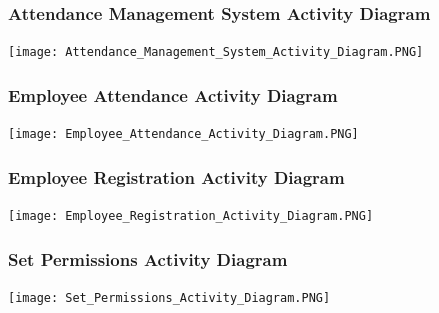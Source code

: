 \documentclass[a4paper, 12pt]{article}
\begin{document}
\subsubsection{Attendance Management System Activity Diagram}
\begin{center}
\texttt{[image: Attendance\_Management\_System\_Activity\_Diagram.PNG]}\par
\end{center}
\subsubsection{Employee Attendance Activity Diagram}
\begin{center}
\texttt{[image: Employee\_Attendance\_Activity\_Diagram.PNG]}\par
\end{center}
\subsubsection{Employee Registration Activity Diagram}
\begin{center}
\texttt{[image: Employee\_Registration\_Activity\_Diagram.PNG]}\par
\end{center}
\subsubsection{Set Permissions Activity Diagram}
\begin{center}
\texttt{[image: Set\_Permissions\_Activity\_Diagram.PNG]}\par
\end{center}
\end{document}
